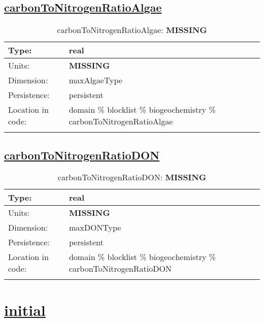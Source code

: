 \subsection[carbonToNitrogenRatioAlgae]{\hyperref[sec:var_tab_biogeochemistry]{carbonToNitrogenRatioAlgae}}
\label{subsec:var_sec_biogeochemistry_carbonToNitrogenRatioAlgae}
\begin{center}
\begin{longtable}{| p{2.0in} | p{4.0in} |}
        \hline 
        Type: & real \\
        \hline 
        Units: & {\bf \color{red} MISSING} \\
        \hline 
        Dimension: & maxAlgaeType \\
        \hline 
        Persistence: & persistent \\
        \hline 
         Location in code: & domain \% blocklist \% biogeochemistry \% carbonToNitrogenRatioAlgae \\
         \hline 
    \caption{carbonToNitrogenRatioAlgae: {\bf \color{red} MISSING}}
\end{longtable}
\end{center}
\subsection[carbonToNitrogenRatioDON]{\hyperref[sec:var_tab_biogeochemistry]{carbonToNitrogenRatioDON}}
\label{subsec:var_sec_biogeochemistry_carbonToNitrogenRatioDON}
\begin{center}
\begin{longtable}{| p{2.0in} | p{4.0in} |}
        \hline 
        Type: & real \\
        \hline 
        Units: & {\bf \color{red} MISSING} \\
        \hline 
        Dimension: & maxDONType \\
        \hline 
        Persistence: & persistent \\
        \hline 
         Location in code: & domain \% blocklist \% biogeochemistry \% carbonToNitrogenRatioDON \\
         \hline 
    \caption{carbonToNitrogenRatioDON: {\bf \color{red} MISSING}}
\end{longtable}
\end{center}
\section[initial]{\hyperref[sec:var_tab_initial]{initial}}
\label{sec:var_sec_initial}
